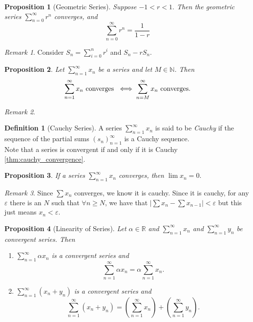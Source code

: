 \documentclass{article}
\newtheorem{proposition}{Proposition}[section]
\theoremstyle{definition}
\newtheorem{definition}{Definition}[section]
\theoremstyle{remark}
\newtheorem{remark}{Remark}[section]
\begin{document}
\begin{proposition}[Geometric Series]\label{prp:geo_series}
Suppose $ -1 < r < 1.$ Then the geometric series $ \sum_{n=0}^\infty{r^n}$ converges, and 
\[
\sum_{n=0}^\infty{r^n} = \frac{1}{1-r}
\]
\end{proposition}

\begin{remark}
    Consider $S_n = \sum^n_{i=0}{r^i}$ and $S_n - rS_n$.
\end{remark}




\begin{proposition}
Let $\sum_{n=1}^\infty{x_n}$ be a series and let $M \in \mathbb{N}$. Then
\[
\sum_{n=1}^\infty{x_n} \textnormal{ converges } \iff \sum_{n=M}^\infty{x_n} \textnormal{ converges.}
\]
\end{proposition}
\begin{remark}
    
\end{remark}


\begin{definition}[Cauchy Series]\label{def:cauchy_series}
A series $\sum_{n=1}^\infty{x_n}$ is said to be \textit{Cauchy} if the sequence of the partial sums $ (s_n)^\infty_{n=1}$ is a Cauchy sequence.\\
Note that a series is convergent if and only if it is Cauchy \ref{thm:cauchy_convergence}.
\end{definition}




\begin{proposition}
If a series $\sum_{n=1}^\infty{x_n}$ converges, then $\lim{x_n} = 0.$
\end{proposition}

\begin{remark}
Since $\sum{x_n}$ converges, we know it is cauchy. Since it is cauchy, 
for any $\varepsilon$ there is an $N$ such that $\forall n \geq N$, we have that 
$|\sum{x_n} - \sum{x_{n-1}}| < \varepsilon$ but this just means $x_n < \varepsilon$.
\end{remark}




\begin{proposition}[Linearity of Series]\label{prp:linearity_series}
Let $\alpha \in \mathbb{R}$ and $\sum_{n=1}^{\infty} x_n$ and $\sum_{n=1}^{\infty} y_n$ be convergent series. Then
\begin{enumerate}
\item $\sum_{n=1}^{\infty} \alpha x_n$ is a convergent series and
\[
\sum_{n=1}^{\infty} \alpha x_n = \alpha \sum_{n=1}^{\infty} x_n.
\]
\item $\sum_{n=1}^{\infty} (x_n + y_n)$ is a convergent series and
\[
\sum_{n=1}^{\infty} (x_n + y_n) = \left( \sum_{n=1}^{\infty} x_n \right) + \left( \sum_{n=1}^{\infty} y_n \right).
\]
\end{enumerate}

\end{proposition}
\end{document}
